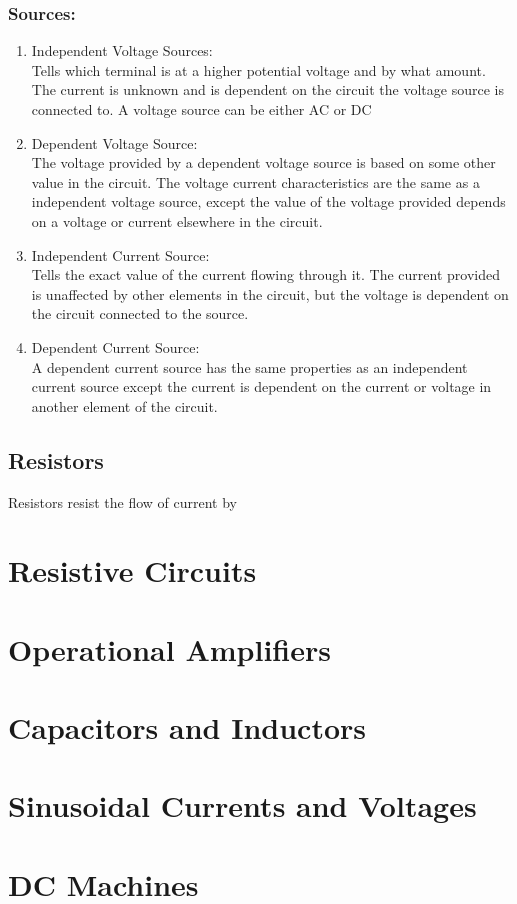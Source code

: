 \documentclass[14pt]{article}
\begin{document}
    \subsubsection{Sources:}
    \begin{enumerate}
        \item Independent Voltage Sources:\\
        Tells which terminal is at a higher potential voltage and by what amount. The current is unknown and is dependent on the circuit the voltage source is connected to. A voltage source can be either AC or DC
        \item Dependent Voltage Source:\\
        The voltage provided by a dependent voltage source is based on some other value in the circuit. The voltage current characteristics are the same as a independent voltage source, except the value of the voltage provided depends on a voltage or current elsewhere in the circuit. 
        \item Independent Current Source:\\
        Tells the exact value of the current flowing through it. The current provided is unaffected by other elements in the circuit, but the voltage is dependent on the circuit connected to the source.
        \item Dependent Current Source:\\
        A dependent current source has the same properties as an independent current source except the current is dependent on the current or voltage in another element of the circuit.
    \end{enumerate} 
    \subsection{Resistors}
    Resistors resist the flow of current by 
    \section{Resistive Circuits}
    \section{Operational Amplifiers}
    \section{Capacitors and Inductors}
    \section{Sinusoidal Currents and Voltages}
    \section{DC Machines}  
\end{document}
